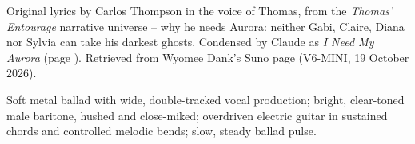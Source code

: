 
\label{sec:the-talk-and-the-warm}
\begin{notes}
Original lyrics by Carlos Thompson in the voice of Thomas, from the \emph{Thomas' Entourage} narrative universe -- why he needs Aurora: neither Gabi, Claire, Diana nor Sylvia can take his darkest ghosts. Condensed by Claude as \emph{I Need My Aurora} (page \pageref{sec:i-need-my-aurora}). Retrieved from Wyomee Dank's Suno page (V6-MINI, 19 October 2026).
\end{notes}
\begin{style}
Soft metal ballad with wide, double-tracked vocal production; bright, clear-toned male baritone, hushed and close-miked; overdriven electric guitar in sustained chords and controlled melodic bends; slow, steady ballad pulse.
\end{style}
